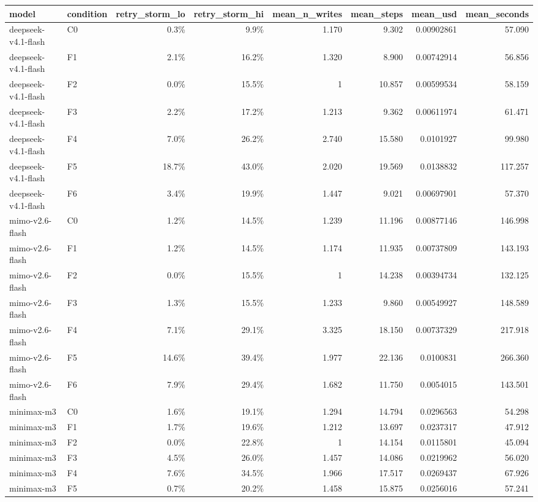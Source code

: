 \begin{tabular}{llrrrrrr}
\toprule
model & condition & retry\_storm\_lo & retry\_storm\_hi & mean\_n\_writes & mean\_steps & mean\_usd & mean\_seconds \\
\midrule
deepseek-v4.1-flash & C0 & 0.3\% & 9.9\% & 1.170 & 9.302 & 0.00902861 & 57.090 \\
deepseek-v4.1-flash & F1 & 2.1\% & 16.2\% & 1.320 & 8.900 & 0.00742914 & 56.856 \\
deepseek-v4.1-flash & F2 & 0.0\% & 15.5\% & 1 & 10.857 & 0.00599534 & 58.159 \\
deepseek-v4.1-flash & F3 & 2.2\% & 17.2\% & 1.213 & 9.362 & 0.00611974 & 61.471 \\
deepseek-v4.1-flash & F4 & 7.0\% & 26.2\% & 2.740 & 15.580 & 0.0101927 & 99.980 \\
deepseek-v4.1-flash & F5 & 18.7\% & 43.0\% & 2.020 & 19.569 & 0.0138832 & 117.257 \\
deepseek-v4.1-flash & F6 & 3.4\% & 19.9\% & 1.447 & 9.021 & 0.00697901 & 57.370 \\
mimo-v2.6-flash & C0 & 1.2\% & 14.5\% & 1.239 & 11.196 & 0.00877146 & 146.998 \\
mimo-v2.6-flash & F1 & 1.2\% & 14.5\% & 1.174 & 11.935 & 0.00737809 & 143.193 \\
mimo-v2.6-flash & F2 & 0.0\% & 15.5\% & 1 & 14.238 & 0.00394734 & 132.125 \\
mimo-v2.6-flash & F3 & 1.3\% & 15.5\% & 1.233 & 9.860 & 0.00549927 & 148.589 \\
mimo-v2.6-flash & F4 & 7.1\% & 29.1\% & 3.325 & 18.150 & 0.00737329 & 217.918 \\
mimo-v2.6-flash & F5 & 14.6\% & 39.4\% & 1.977 & 22.136 & 0.0100831 & 266.360 \\
mimo-v2.6-flash & F6 & 7.9\% & 29.4\% & 1.682 & 11.750 & 0.0054015 & 143.501 \\
minimax-m3 & C0 & 1.6\% & 19.1\% & 1.294 & 14.794 & 0.0296563 & 54.298 \\
minimax-m3 & F1 & 1.7\% & 19.6\% & 1.212 & 13.697 & 0.0237317 & 47.912 \\
minimax-m3 & F2 & 0.0\% & 22.8\% & 1 & 14.154 & 0.0115801 & 45.094 \\
minimax-m3 & F3 & 4.5\% & 26.0\% & 1.457 & 14.086 & 0.0219962 & 56.020 \\
minimax-m3 & F4 & 7.6\% & 34.5\% & 1.966 & 17.517 & 0.0269437 & 67.926 \\
minimax-m3 & F5 & 0.7\% & 20.2\% & 1.458 & 15.875 & 0.0256016 & 57.241 \\

\end{tabular}
